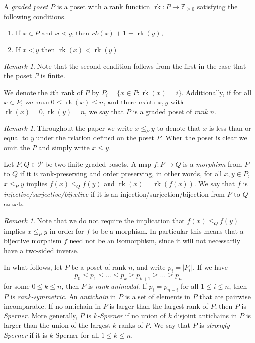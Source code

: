 \documentclass[smallextended, envcountsame, numbook]{svjour3}
\theoremstyle{plain}
\theoremstyle{definition}
\theoremstyle{remark}
\newtheorem{rmk}[thm]{Remark}
\numberwithin{equation}{section}
\newcommand\rk{\operatorname{rk}}
\begin{document}
A {\it graded poset} $P$ is a poset with a rank function $\rk\colon P \rightarrow \mathbb Z_{\geq 0}$ satisfying the following conditions.
\begin{enumerate}
  \item If $x\in P$ and $x\lessdot y$, then $rk(x) + 1 = \rk(y)$,
  \item If $x < y$ then $\rk(x) < \rk(y)$ 
\end{enumerate}

\begin{rmk}
Note that the second condition follows from the first in the case that the poset $P$ is finite.
\end{rmk}

We denote the $i$th rank of $P$ by  $P_i = \{x \in P\colon\rk(x) = i\}$. Additionally, if for all $x\in P$, we have $0 \leq \rk(x) \leq n$, and there exists $x,y$ with $\rk(x) = 0, \rk(y) = n$, we say that $P$ is a graded poset of {\it rank $n$}.

\begin{rmk}
Throughout the paper we write $x\le_P y$ to denote that $x$ is less than or equal to $y$ under the relation defined on the poset $P$.  When the poset is clear we omit the $P$ and simply write $x\le y$.  
\end{rmk}
Let $P, Q \in \mathcal P$ be two finite graded posets.  A map $f\colon P\rightarrow Q$ is a \textit{morphism} from $P$ to $Q$ if it is rank-preserving and order preserving, in other words, for all $x,y\in P$, $x\le_P y $ implies $f(x)\le_Q f(y)$ and $\rk(x) = \rk(f(x))$.  We say that $f$ is \textit{injective/surjective/bijective} if it is an injection/surjection/bijection from $P$ to $Q$ as sets.

\begin{rmk}\label{rem:bijective_morphism_not_isomorphism}
Note that we do not require the implication that $f(x)\le_Q f(y)$ implies $x\le_P y$ in order for $f$ to be a morphism.  In particular this means that a bijective morphism $f$ need not be an isomorphism, since it will not necessarily have a two-sided inverse.  
\end{rmk}


In what follows, let $P$ be a poset of rank $n$, and write $p_i = |P_i|$.  If we have
$$p_0\le p_1\le \ldots \le p_k \ge p_{k+1} \ge\ldots \ge p_n$$
for some $0\le k\le n$, then $P$ is \textit{rank-unimodal}. If $p_i = p_{n-i}$ for all $1\le i\le n$, then $P$ is \textit{rank-symmetric}.  An \textit{antichain} in $P$ is a set of elements in $P$ that are pairwise incomparable.  If no antichain in $P$ is larger than the largest rank of $P$, then $P$ is \textit{Sperner}.  More generally, $P$ is \textit{$k$-Sperner} if no union of $k$ disjoint antichains in $P$ is larger than the union of the largest $k$ ranks of $P$. We say that $P$ is \textit{strongly Sperner} if it is $k$-Sperner for all $1\le k\le n$.
\end{document}
